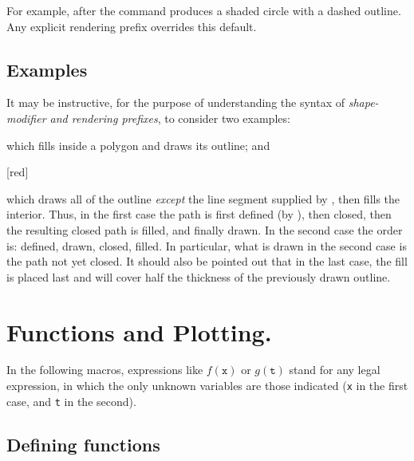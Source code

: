 \documentclass[letterpaper]{article}
\begin{document}
For example, after  the
command  produces a shaded circle with a dashed
outline. Any explicit rendering prefix overrides this default.

\subsection{Examples}\label{examples}

It may be instructive, for the purpose of understanding the syntax of
\emph{shape-modifier and rendering prefixes}, to consider two examples:
\begin{ex}
    \marg{$\ldots$}
\end{ex}
which fills inside a polygon and draws its outline; and
\begin{ex}
    [red]\marg{$\ldots$}
\end{ex}
which draws all of the outline \emph{except} the line segment supplied
by , then fills the interior. Thus, in the first case the
path is first defined (by ), then closed, then the resulting closed
path is filled, and finally drawn. In the second case the order is:
defined, drawn, closed, filled. In particular, what is drawn in the
second case is the path not yet closed. It should also be pointed out
that in the last case, the fill is placed last and will cover half
the thickness of the previously drawn outline.


\section{Functions and Plotting.}\label{functions}

In the following macros, expressions like $f(\mathtt{x})$ or $g(\mathtt{t})$
stand for any legal \MF{} expression, in which the only unknown
variables are those indicated (\texttt{x} in the first case, and \texttt{t} in
the second).

\subsection{Defining functions}\label{defining}

\begin{cd}
%
\end{cd}
\end{document}

